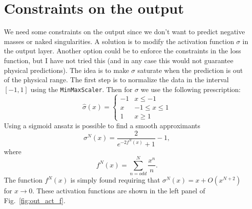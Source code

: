 \documentclass[prd,aps,twocolumn,a4paper,showkeys,nofootinbib]{article}
\begin{document}
\section{Constraints on the output}
\label{sec:constraints}
We need some constraints on the output since we don't want to predict negative masses 
or naked singularities. A solution is to modify the activation function 
$\sigma$ in the output layer.
Another option could be to enforce the constraints in the loss function, but I have not tried this
(and in any case this would not guarantee physical predictions). 
The idea is to make $\sigma$ saturate when the prediction is out of the physical range. 
The first step is to normalize the data in the interval $[-1,1]$ using the \texttt{MinMaxScaler}.
Then for $\sigma$ we use the following prescription:
\begin{equation}
\hat{\sigma}(x) = \begin{cases} 
      -1 & x\leq -1 \\
      x & -1\leq x\leq 1 \\
      1 & x \geq 1 
\end{cases}
\end{equation}
Using a sigmoid ansatz is possible to find a smooth approximants
\begin{equation}
\sigma^N(x)  = \frac{2}{e^{-2 f^N(x)}+1}-1,
\end{equation}
where 
\begin{equation}
f^N(x)  = \sum_{n=odd}^{N} \frac{x^{n}}{n}.
\end{equation}
The function $f^N(x)$ is  simply found requiring that $\sigma^N(x)=x+O(x^{N+2})$ 
for $x\rightarrow 0$.
These activation functions are shown in the left panel of Fig.~\ref{fig:out_act_f}.
%
\end{document}
